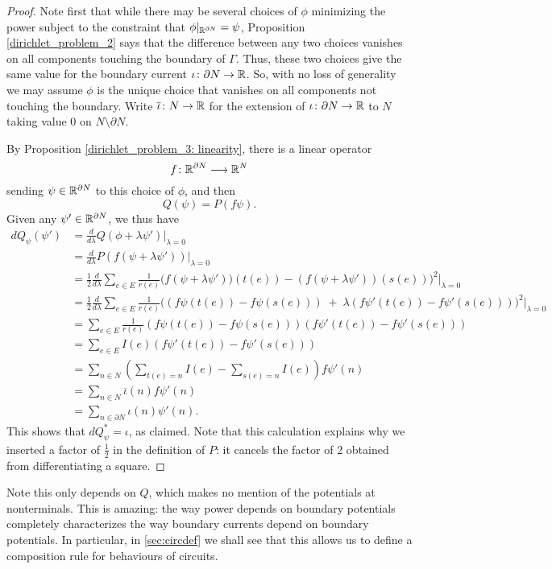 \begin{proof}
Note first that while there may be several choices of $\phi$ minimizing the power subject to the constraint that $\phi|_{{\mathbb{R}}^{\partial N}} = \psi$, Proposition \ref{dirichlet_problem_2} says that the difference between any two choices vanishes on all components touching the boundary of $\Gamma$.  Thus, these two choices give the same value for the boundary current $\iota{\colon} \partial N \to {\mathbb{R}}$. So, with no loss of generality we may assume $\phi$ is the unique choice that vanishes on all components not touching the boundary. Write $\overline\iota{\colon} N \to {\mathbb{R}}$ for the extension of $\iota{\colon} \partial N \to {\mathbb{R}}$ to $N$ taking value $0$ on $N \setminus \partial N$. 

By Proposition \ref{dirichlet_problem_3: linearity}, there is a linear operator
\[
f{\colon} {\mathbb{R}}^{\partial N} \longrightarrow {\mathbb{R}}^N
\]
sending $\psi \in {\mathbb{R}}^{\partial N}$ to this choice of $\phi$, and then
\[
Q(\psi) = P(f\psi).
\]
Given any $\psi' \in {\mathbb{R}}^{\partial N}$, we thus have
\begin{align*}
dQ_\psi(\psi') &= \frac{d}{d\lambda}Q(\phi +\lambda\psi') \bigg|_{\lambda=0} \\
&= \frac{d}{d\lambda}P(f(\psi+\lambda\psi'))\bigg|_{\lambda=0} \\
&= \frac{1}{2} \frac{d}{d\lambda}\sum_{e \in E} \frac1{r(e)}\bigg(f(\psi+\lambda\psi'))(t(e))-(f(\psi+\lambda\psi'))(s(e))\bigg)^2 \bigg|_{\lambda=0} \\
&= \frac{1}{2} \frac{d}{d\lambda}\sum_{e \in E} \frac1{r(e)}\bigg((f\psi(t(e))-f\psi(s(e))) \;+\;\lambda (f\psi'(t(e))- f\psi'(s(e)))\bigg)^2 \bigg|_{\lambda=0} \\
&= \sum_{e \in E} \frac1{r(e)}(f\psi(t(e))-f\psi(s(e)))(f\psi'(t(e))- f\psi'(s(e))) \\
&= \sum_{e \in E} I(e)(f\psi'(t(e))- f\psi'(s(e))) \\
&= \sum_{n \in N}\left(\sum_{t(e) = n} I(e) - \sum_{s(e) = n} I(e)\right)f\psi'(n) \\
&= \sum_{n \in N}\overline \iota(n) f\psi'(n) \\
&= \sum_{n \in \partial N}\iota(n) \psi'(n).
\end{align*}
This shows that $dQ_\psi^\ast = \iota$, as claimed.  Note that this calculation
explains why we inserted a factor of $\frac{1}{2}$ in the definition of $P$: it
cancels the factor of $2$ obtained from differentiating a square.
 \end{proof}

Note this only depends on $Q$, which makes no mention of the potentials at
nonterminals. This is amazing: the way power depends on boundary potentials
completely characterizes the way boundary currents depend on boundary
potentials. In particular, in \textsection\ref{sec:circdef} we shall see that this
allows us to define a composition rule for behaviours of circuits.

